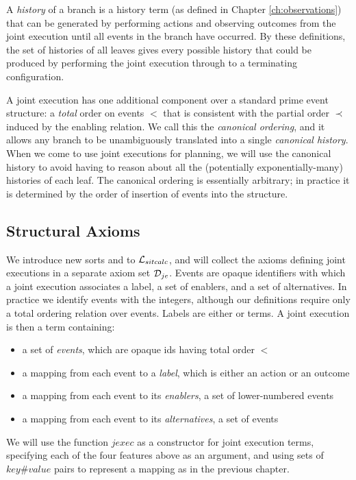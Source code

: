 A \emph{history} of a branch is a history term (as defined in Chapter
\ref{ch:observations}) that can be generated by performing actions
and observing outcomes from the joint execution until all events in
the branch have occurred. By these definitions, the set of histories
of all leaves gives every possible history that could be produced
by performing the joint execution through to a terminating configuration.

A joint execution has one additional component over a standard prime
event structure: a \emph{total} order on events $<$ that is consistent
with the partial order $\prec$ induced by the enabling relation.
We call this the \emph{canonical ordering}, and it allows any branch
to be unambiguously translated into a single \emph{canonical history}.
When we come to use joint executions for planning, we will use the
canonical history to avoid having to reason about all the (potentially
exponentially-many) histories of each leaf. The canonical ordering
is essentially arbitrary; in practice it is determined by the order
of insertion of events into the structure.


\subsection{Structural Axioms}

We introduce new sorts and  to $\mathcal{L}_{sitcalc}$,
and will collect the axioms defining joint executions in a separate
axiom set $\mathcal{D}_{je}$. Events are opaque identifiers with which a
joint execution associates a label, a set of enablers, and a set of
alternatives. In practice we identify events with the integers, although
our definitions require only a total ordering relation over events.
Labels are either  or  terms. A joint execution
is then a term containing:

\begin{itemize}
\item a set of \emph{events}, which are opaque ids having total order $<$ 
\item a mapping from each event to a \emph{label}, which is either an action
or an outcome 
\item a mapping from each event to its \emph{enablers}, a set of lower-numbered
events 
\item a mapping from each event to its \emph{alternatives}, a set of events 
\end{itemize}
We will use the function $jexec$ as a constructor for joint execution
terms, specifying each of the four features above as an argument,
and using sets of $key\#value$ pairs to represent a mapping as in
the previous chapter.

